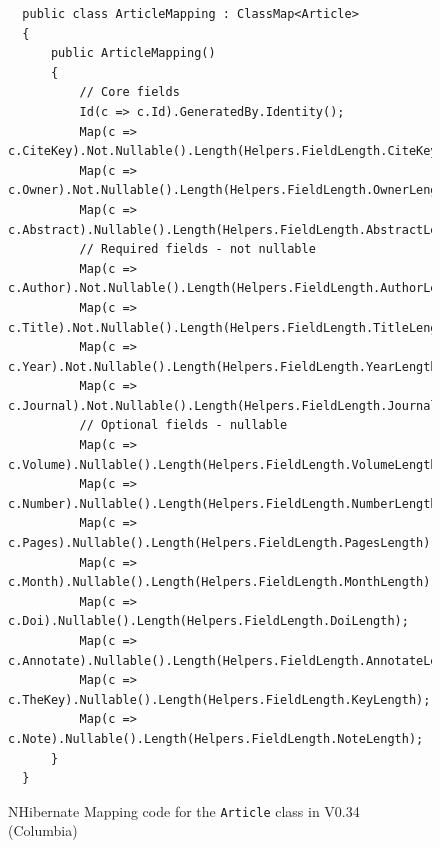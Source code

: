 \begin{figure}
	\begin{center}
			\lstset{language=CSharp} 
			\begin{lstlisting}
  public class ArticleMapping : ClassMap<Article>
  {
      public ArticleMapping()
      {
          // Core fields
          Id(c => c.Id).GeneratedBy.Identity();
          Map(c => c.CiteKey).Not.Nullable().Length(Helpers.FieldLength.CiteKeyLength);
          Map(c => c.Owner).Not.Nullable().Length(Helpers.FieldLength.OwnerLength);
          Map(c => c.Abstract).Nullable().Length(Helpers.FieldLength.AbstractLength);
          // Required fields - not nullable
          Map(c => c.Author).Not.Nullable().Length(Helpers.FieldLength.AuthorLength);
          Map(c => c.Title).Not.Nullable().Length(Helpers.FieldLength.TitleLength);
          Map(c => c.Year).Not.Nullable().Length(Helpers.FieldLength.YearLength);
          Map(c => c.Journal).Not.Nullable().Length(Helpers.FieldLength.JournalLength);
          // Optional fields - nullable
          Map(c => c.Volume).Nullable().Length(Helpers.FieldLength.VolumeLength);
          Map(c => c.Number).Nullable().Length(Helpers.FieldLength.NumberLength);
          Map(c => c.Pages).Nullable().Length(Helpers.FieldLength.PagesLength);
          Map(c => c.Month).Nullable().Length(Helpers.FieldLength.MonthLength);
          Map(c => c.Doi).Nullable().Length(Helpers.FieldLength.DoiLength);
          Map(c => c.Annotate).Nullable().Length(Helpers.FieldLength.AnnotateLength);
          Map(c => c.TheKey).Nullable().Length(Helpers.FieldLength.KeyLength);
          Map(c => c.Note).Nullable().Length(Helpers.FieldLength.NoteLength);
      }
  }			
			\end{lstlisting}
		\caption{NHibernate Mapping code for the \texttt{Article} class in V0.34 (Columbia)}
		\label{fig:articleMappingCode}
	\end{center}
\end{figure}

